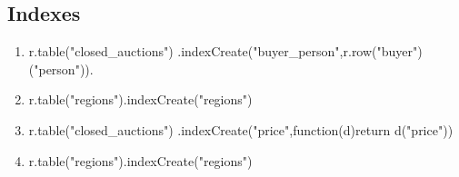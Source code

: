 \subsection{Indexes}
\begin{enumerate}[label=I\arabic*]
\item \label{rethinkdb-i-1}
\begin{fakeJSON}
  r.table("closed_auctions")
    .indexCreate("buyer_person",r.row("buyer")("person")).
\end{fakeJSON}

\item \label{rethinkdb-i-2}
\begin{fakeJSON}
  r.table("regions").indexCreate("regions")
\end{fakeJSON}

\item \label{rethinkdb-i-3}
\begin{fakeJSON}
  r.table("closed_auctions")
    .indexCreate("price",function(d){return d("price")})
\end{fakeJSON}

\item \label{rethinkdb-i-4}
\begin{fakeJSON}
  r.table("regions").indexCreate("regions")
\end{fakeJSON}


\end{enumerate}